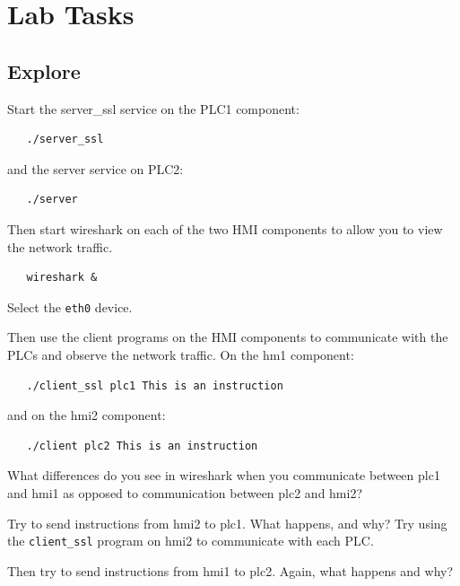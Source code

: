 \section{Lab Tasks}
\subsection{Explore}
Start the server\_ssl service on the PLC1 component:
\begin{verbatim}
   ./server_ssl
\end{verbatim}
\noindent and the server service on PLC2:
\begin{verbatim}
   ./server
\end{verbatim}

\noindent Then start wireshark on each of the two HMI components to allow you to
view the network traffic.
\begin{verbatim}
   wireshark &
\end{verbatim}
\noindent Select the {\tt eth0} device.

Then use the client programs on the HMI components to communicate with the PLCs and observe
the network traffic.  On the hm1 component:
\begin{verbatim}
   ./client_ssl plc1 This is an instruction
\end{verbatim}

\noindent and on the hmi2 component:
\begin{verbatim}
   ./client plc2 This is an instruction
\end{verbatim}

What differences do you see in wireshark when you communicate between plc1 and hmi1 as 
opposed to communication between plc2 and hmi2?

Try to send instructions from hmi2 to plc1.  What happens, and why?
Try using the {\tt client\_ssl} program on hmi2 to communicate with each PLC.

Then try to send instructions from hmi1 to plc2.  Again, what happens and why?

